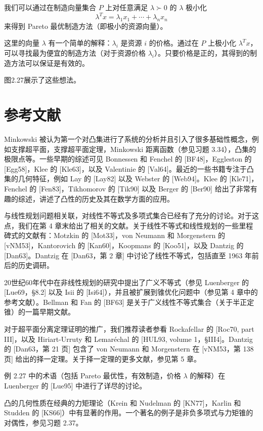 \documentclass[UTF8, 12pt, fontset=fandol, oneside]{ctexart}
\begin{document}
我们可以通过在制造向量集合 $P$ 上对任意满足 $\lambda\succ0$ 的 $\lambda$ 极小化
\[
  \lambda^Tx=\lambda_1x_1+\cdots+\lambda_nx_n
\]
来得到 Pareto 最优制造方法（即极小的资源向量）。

这里的向量 $\lambda$ 有一个简单的解释：$\lambda_i$ 是资源 $i$ 的价格。通过在 $P$ 上极小化 $\lambda^Tx$，可以寻找最为便宜的制造方法（对于资源价格 $\lambda_i$）。只要价格是正的，其得到的制造方法可以保证是有效的。

图2.27展示了这些想法。

\section*{参考文献}

Minkowski 被认为第一个对凸集进行了系统的分析并且引入了很多基础性概念，例如支撑超平面，支撑超平面定理，Minkowski 距离函数（参见习题 3.34），凸集的极限点等。一些早期的综述可见 Bonnessen 和 Fenchel 的 [BF48]，Eggleston 的 [Egg58]，Klee 的 [Kle63]，以及 Valentinie 的 [Val64]。最近的一些书籍专注于凸集的几何特征，例如 Lay 的 [Lay82] 以及 Webster 的 [Web94]。Klee 的 [Kle71]，Fenchel 的 [Fen83]，Tikhomorov 的 [Tik90] 以及 Berger 的 [Ber90] 给出了非常有趣的综述，讲述了凸性的历史及其在数学方面的应用。

与线性规划问题相关联，对线性不等式及多项式集合已经有了充分的讨论。对于这点，我们在第 4 章末给出了相关的文献。关于线性不等式和线性规划的一些里程碑式的文献有：Motzkin 的 [Mot33]，von Neumann 和 Morgenstern 的 [vNM53]，Kantorovich 的 [Kan60]，Koopmans 的 [Koo51]，以及 Dantzig 的 [Dan63]。Dantzig 在 [Dan63，第 2 章] 中讨论了线性不等式，包括直至 1963 年前后的历史调研。

20世纪60年代中在非线性规划的研究中提出了广义不等式（参见 Luenberger 的 [Lue69，§8.2] 以及 Isii 的 [Isi64]），并且被扩展到锥优化问题中（参见第 4 章中的参考文献）。Bellman 和 Fan 的 [BF63] 是关于广义线性不等式集合（关于半正定锥）的一篇早期文献。

对于超平面分离定理证明的推广，我们推荐读者参看 Rockafellar 的 [Roc70, part III]，以及 Hiriart-Urruty 和 Lemaréchal 的 [HUL93, volume 1，§III4]。Dantzig 的 [Dan63，第 21 页] 包含了 von Neumann 和 Morgenstern 在 [vNM53，第 138 页] 给出的择一定理。关于择一定理的更多文献，参见第 5 章。

例 2.27 中的术语（包括 Pareto 最优性，有效制造，价格 $\lambda$ 的解释）在 Luenberger 的 [Lue95] 中进行了详尽的讨论。

凸的几何性质在经典的力矩理论（Krein 和 Nudelman 的 [KN77]，Karlin 和 Studden 的 [KS66]）中有显著的作用。一个著名的例子是非负多项式与力矩锥的对偶性，参见习题 2.37。
\end{document}
